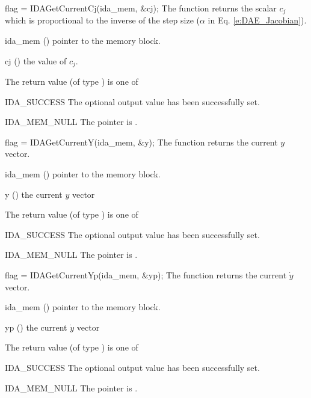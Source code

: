 {
  flag = IDAGetCurrentCj(ida\_mem, \&cj);
}
{
  The function  returns the scalar $c_j$
  which is proportional to the inverse of the step size ($\alpha$ in
  Eq. \ref{e:DAE_Jacobian}).
}
{
  \begin{args}
  \item[ida\_mem] ()
    pointer to the {\idas} memory block.
  \item[cj] ()
    the value of $c_j$.
  \end{args}
}
{
  The return value  (of type ) is one of
  \begin{args}
  \item[IDA\_SUCCESS]
    The optional output value has been successfully set.
  \item[IDA\_MEM\_NULL]
    The  pointer is .
  \end{args}
}
{}

{
  flag = IDAGetCurrentY(ida\_mem, \&y);
}
{
  The function  returns the current $y$ vector.
}
{
  \begin{args}
  \item[ida\_mem] ()
    pointer to the {\idas} memory block.
  \item[y] ()
    the current $y$ vector
  \end{args}
}
{
  The return value  (of type ) is one of
  \begin{args}
  \item[IDA\_SUCCESS]
    The optional output value has been successfully set.
  \item[IDA\_MEM\_NULL]
    The  pointer is .
  \end{args}
}
{}

{
  flag = IDAGetCurrentYp(ida\_mem, \&yp);
}
{
  The function  returns the current $\dot{y}$ vector.
}
{
  \begin{args}
  \item[ida\_mem] ()
    pointer to the {\idas} memory block.
  \item[yp] ()
    the current $\dot{y}$ vector
  \end{args}
}
{
  The return value  (of type ) is one of
  \begin{args}
  \item[IDA\_SUCCESS]
    The optional output value has been successfully set.
  \item[IDA\_MEM\_NULL]
    The  pointer is .
  \end{args}
}
{}

